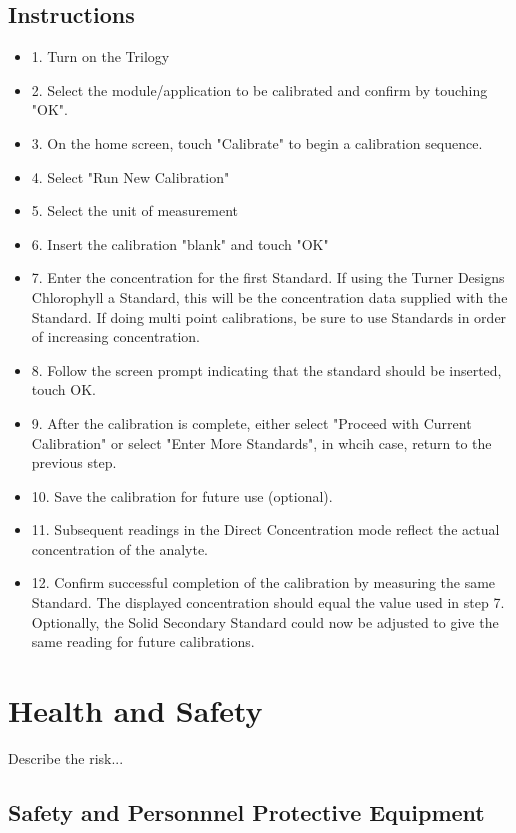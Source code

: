 \documentclass[12pt]{../SOP3_beta}
\begin{document}
\subsection{Instructions}
\begin{itemize}
  \item 1. Turn on the Trilogy
  \item 2. Select the module/application to be calibrated and confirm by touching "OK".
  \item 3. On the home screen, touch "Calibrate" to begin a calibration sequence.
  \item 4. Select "Run New Calibration"
  \item 5. Select the unit of measurement 
  \item 6. Insert the calibration "blank" and touch "OK"
  \item 7. Enter the concentration for the first Standard. If using the Turner Designs Chlorophyll a Standard, this will be the concentration data supplied with the Standard. If doing multi point calibrations, be sure to use Standards in order of increasing concentration.
  \item 8. Follow the screen prompt indicating that the standard should be inserted, touch OK.
  \item 9. After the calibration is complete, either select "Proceed with Current Calibration" or select "Enter More Standards", in whcih case, return to the previous step.
  \item 10. Save the calibration for future use (optional).
  \item 11. Subsequent readings in the Direct Concentration mode reflect the actual concentration of the analyte. 
  \item 12. Confirm successful completion of the calibration by measuring the same Standard. The displayed concentration should equal the value used in step 7. Optionally, the Solid Secondary Standard could now be adjusted to give the same reading for future calibrations.
\end{itemize}
\section{Health and Safety}

\NP Describe the risk...


\subsection{Safety and Personnnel Protective Equipment}
\end{document}
